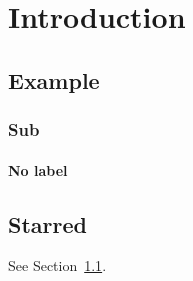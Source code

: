 \documentclass{book}
\begin{document}
\chapter{Introduction}
\section{Example}\label{sec:example}
\subsection{Sub}
\subsubsection{No label}
\section*{Starred}
See Section~\ref{sec:example}.
\end{document}
